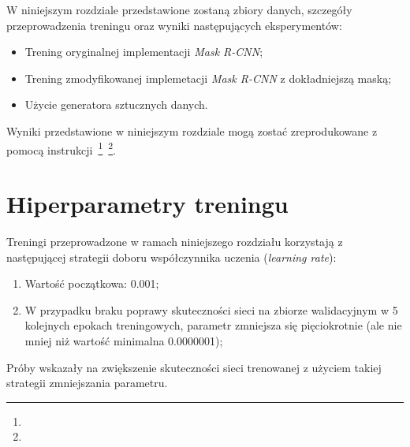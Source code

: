 
W niniejszym rozdziale przedstawione zostaną zbiory danych, szczegóły przeprowadzenia treningu oraz wyniki następujących eksperymentów:

\begin{itemize}
 \item Trening oryginalnej implementacji \textit{Mask R-CNN};
 \item Trening zmodyfikowanej implemetacji \textit{Mask R-CNN} z dokładniejszą maską;
 \item Użycie generatora sztucznych danych.
\end{itemize}

Wyniki przedstawione w niniejszym rozdziale mogą zostać zreprodukowane z pomocą instrukcji~\footnote{}~\footnote{}.

\section{Hiperparametry treningu}

Treningi przeprowadzone w ramach niniejszego rozdziału korzystają z następującej strategii doboru współczynnika uczenia (\textit{learning rate}):
\begin{enumerate}
  \item Wartość początkowa: 0.001;
  \item W przypadku braku poprawy skuteczności sieci na zbiorze walidacyjnym w 5 kolejnych epokach treningowych, parametr zmniejsza się pięciokrotnie (ale nie mniej niż wartość minimalna 0.0000001);
\end{enumerate}

Próby wskazały na zwiększenie skuteczności sieci trenowanej z użyciem takiej strategii zmniejszania parametru.
